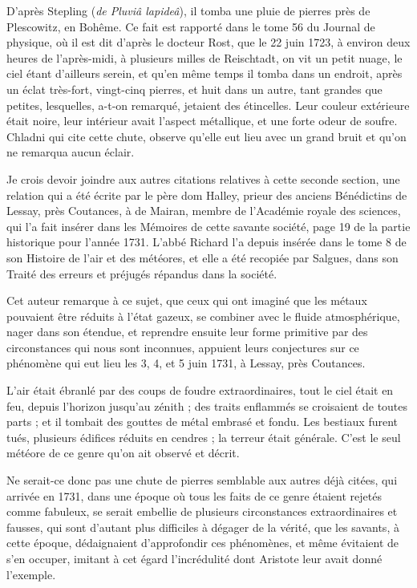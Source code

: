 \documentclass[a4paper, 12pt, oneside, french]{article}
\begin{document}
D'après Stepling (\emph{de Pluviâ lapideâ}), il tomba une pluie de pierres près de Plescowitz, en Bohême. Ce fait est rapporté dans le tome 56 du Journal de physique, où il est dit d'après le docteur Rost, que le 22 juin 1723, à environ deux heures de l'après-midi, à plusieurs milles de Reischtadt, on vit un petit nuage, le ciel étant d'ailleurs serein, et qu'en même temps il tomba dans un endroit, après un éclat très-fort, vingt-cinq pierres, et huit dans un autre, tant grandes que petites, lesquelles, a-t-on remarqué, jetaient des étincelles. Leur couleur extérieure était noire, leur intérieur avait l'aspect métallique, et une forte odeur de soufre. Chladni qui cite cette chute, observe qu'elle eut lieu avec un grand bruit et qu'on ne remarqua aucun éclair.

Je crois devoir joindre aux autres citations relatives à cette seconde section, une relation qui a été écrite par le père dom Halley, prieur des anciens Bénédictins de Lessay, près Coutances, à de Mairan, membre de l'Académie royale des sciences, qui l'a fait insérer dans les Mémoires de cette savante société, page 19 de la partie historique pour l'année 1731. L'abbé Richard l'a depuis insérée dans le tome 8 de son Histoire de l'air et des météores, et elle a été recopiée par Salgues, dans son Traité des erreurs et préjugés répandus dans la société.

Cet auteur remarque à ce sujet, que ceux qui ont imaginé que les métaux pouvaient être réduits à l'état gazeux, se combiner avec le fluide atmosphérique, nager dans son étendue, et reprendre ensuite leur forme primitive par des circonstances qui nous sont inconnues, appuient leurs conjectures sur ce phénomène qui eut lieu les 3, 4, et 5 juin 1731, à Lessay, près Coutances.

L'air était ébranlé par des coups de foudre extraordinaires, tout le ciel était en feu, depuis l'horizon jusqu'au zénith ; des traits enflammés se croisaient de toutes parts ; et il tombait des gouttes de métal embrasé et fondu. Les bestiaux furent tués, plusieurs édifices réduits en cendres ; la terreur était générale. C'est le seul météore de ce genre qu'on ait observé et décrit.

Ne serait-ce donc pas une chute de pierres semblable aux autres déjà citées, qui arrivée en 1731, dans une époque où tous les faits de ce genre étaient rejetés comme fabuleux, se serait embellie de plusieurs circonstances extraordinaires et fausses, qui sont d'autant plus difficiles à dégager de la vérité, que les savants, à cette époque, dédaignaient d'approfondir ces phénomènes, et même évitaient de s'en occuper, imitant à cet égard l'incrédulité dont Aristote leur avait donné l'exemple.
\end{document}
